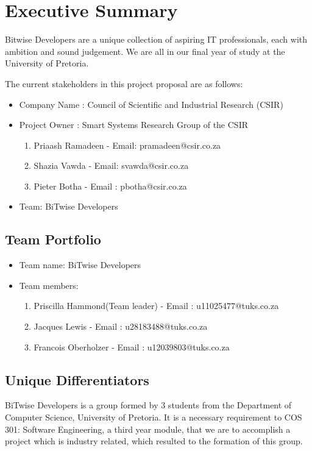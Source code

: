 \documentclass[a4paper]{article}
\begin{document}
	\section{Executive Summary}

	Bitwise Developers are a unique collection of aspiring IT professionals, each with ambition 		and sound judgement. We are all in our final year of study at the University of Pretoria. 

	The current stakeholders in this project proposal are as follows:
	\begin{itemize}
		\item Company Name : Council of Scientific and Industrial Research (CSIR)
		\item Project Owner : Smart Systems Research Group of the CSIR
		\begin{enumerate}
		\item Priaash Ramadeen - Email:  pramadeen@csir.co.za
		\item Shazia Vawda - Email: svawda@csir.co.za
		\item Pieter Botha - Email : pbotha@csir.co.za
		\end{enumerate}
		\item Team: BiTwise Developers
	\end{itemize}
		
		\subsection{Team Portfolio}
		\begin{itemize}
		\item Team name: BiTwise Developers
        \item Team members: 
        \begin{enumerate}
        \item Priscilla Hammond(Team leader) - Email : u11025477@tuks.co.za
        \item Jacques Lewis - Email : u28183488@tuks.co.za
        \item Francois Oberholzer - Email : u12039803@tuks.co.za
        \end{enumerate}         
		\end{itemize}
		


		\subsection{Unique Differentiators}
		BiTwise Developers is a group formed by 3 students from the Department of Computer 					Science, University of Pretoria. It is a necessary requirement to COS 301: Software 				Engineering, a third year module, that we are to accomplish a project which is industry 			related, which resulted to the formation of this group.
\end{document}
